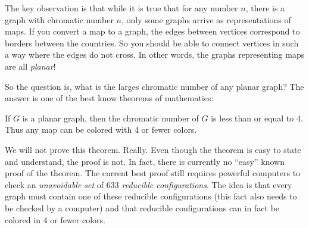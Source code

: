 \documentclass[12pt]{article}
\begin{document}
The key observation is that while it is true that for any number $n$, there is a graph with chromatic number $n$, only some graphs arrive as representations of maps.  If you convert a map to a graph, the edges between vertices correspond to borders between the countries.  So you should be able to connect vertices in such a way where the edges do not cross.  In other words, the graphs representing maps are all {\em planar}!

So the question is, what is the larges chromatic number of any planar graph?  The answer is one of the best know theorems of mathematics:

\begin{theorem}
If $G$ is a planar graph, then the chromatic number of $G$ is less than or equal to 4.  Thus any map can be colored with 4 or fewer colors.
\end{theorem}

We will not prove this theorem.  Really.  Even though the theorem is easy to state and understand, the proof is not.  In fact, there is currently no ``easy'' known proof of the theorem.  The current best proof still requires powerful computers to check an {\em unavoidable set} of  633 {\em reducible configurations}.  The idea is that every graph must contain one of these reducible configurations (this fact also needs to be checked by a computer) and that reducible configurations can in fact be colored in 4 or fewer colors. 
\end{document}
